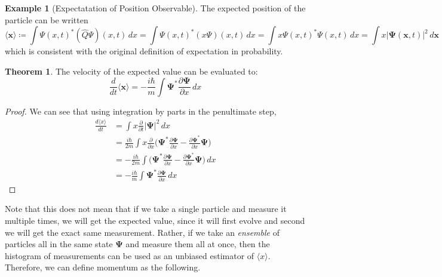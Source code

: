 \documentclass{article}
\theoremstyle{definition}
\newtheorem{theorem}{Theorem}[section]
\newtheorem{example}{Example}[section]
\begin{document}
      \begin{example}[Expectatation of Position Observable]
        The expected position of the particle can be written
        \begin{equation} 
          \langle \mathbf{x} \rangle \coloneqq \int \Psi (x, t)^\ast (\hat{Q} \Psi)(x, t) \,dx = \int \Psi(x, t)^\ast (x \Psi)(x, t) \,dx = \int x \Psi (x, t)^\ast \Psi(x, t) \,dx = \int x |\boldsymbol{\Psi}(\mathbf{x}, t)|^2 \,d \mathbf{x}
        \end{equation} 
        which is consistent with the original definition of expectation in probability. 
      \end{example}

      \begin{theorem} 
        The velocity of the expected value can be evaluated to: 
        \begin{equation} 
          \frac{d}{dt} \langle \mathbf{x} \rangle = -\frac{i \hbar}{m} \int \boldsymbol{\Psi}^\ast \frac{\partial \boldsymbol{\Psi}}{\partial x} \,dx
        \end{equation}
      \end{theorem}
      \begin{proof} 
        We can see that using integration by parts in the penultimate step, 
        \begin{align} 
          \frac{d \langle x \rangle}{dt} & = \int x \frac{\partial}{\partial t} |\boldsymbol{\Psi}|^2 \,dx \\
                                         & = \frac{i \hbar}{2m} \int x \frac{\partial}{\partial x} \bigg( \boldsymbol{\Psi}^\ast \frac{\partial \boldsymbol{\Psi}}{\partial x} - \frac{\partial \boldsymbol{\Psi}^\ast}{\partial x} \boldsymbol{\Psi} \bigg) \\
                                         & = - \frac{i \hbar}{2m} \int \bigg( \boldsymbol{\Psi}^\ast \frac{\partial \boldsymbol{\Psi}}{\partial x} - \frac{\partial \boldsymbol{\Psi}^\ast}{\partial x} \boldsymbol{\Psi} \bigg) \,dx \\
                                         & = -\frac{i \hbar}{m} \int \boldsymbol{\Psi}^\ast \frac{\partial \boldsymbol{\Psi}}{\partial x} \,dx
        \end{align}
      \end{proof}

      Note that this does not mean that if we take a single particle and measure it multiple times, we will get the expected value, since it will first evolve and second we will get the exact same measurement. Rather, if we take an \textit{ensemble} of particles all in the same state $\mathbf{\Psi}$ and measure them all at once, then the histogram of measurements can be used as an unbiased estimator of $\langle x \rangle$. Therefore, we can define momentum as the following. 
\end{document}
